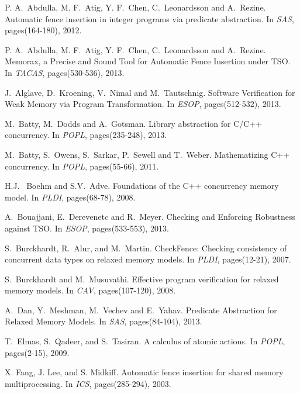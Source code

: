 \documentclass[preprint,9pt]{sigplanconf}
\begin{document}

\begin{thebibliography}{10}

P. A.~Abdulla, M. F.~Atig, Y. F.~Chen, C.~Leonardsson and A.~Rezine.
\newblock Automatic fence insertion in integer programs via predicate abstraction.
\newblock In {\em SAS}, pages(164-180), 2012.

P. A.~Abdulla, M. F.~Atig, Y. F.~Chen, C.~Leonardsson and A.~Rezine.
\newblock Memorax, a Precise and Sound Tool for Automatic Fence Insertion under TSO.
\newblock In {\em TACAS}, pages(530-536), 2013.

J.~Alglave, D.~Kroening, V.~Nimal and M.~Tautschnig.
\newblock   Software Verification for Weak Memory via Program Transformation.
\newblock In {\em ESOP}, pages(512-532), 2013.

M.~Batty, M.~Dodds and A.~Gotsman.
\newblock Library abstraction for C/C++ concurrency.
\newblock In {\em POPL}, pages(235-248), 2013.

M.~Batty, S.~Owens, S.~Sarkar, P.~Sewell and T.~Weber.
\newblock Mathematizing C++ concurrency.
\newblock In {\em POPL}, pages(55-66), 2011.

H.J.~ Boehm and S.V.~Adve.
\newblock Foundations of the C++ concurrency memory model.
\newblock In {\em PLDI}, pages(68-78), 2008.

A.~Bouajjani, E.~Derevenetc and R.~Meyer.
\newblock Checking and Enforcing Robustness against TSO.
\newblock In {\em ESOP}, pages(533-553), 2013.

S.~Burckhardt, R.~Alur, and M.~Martin.
\newblock CheckFence: Checking consistency of concurrent data types on relaxed memory models.
\newblock In {\em PLDI}, pages(12-21), 2007.

S.~Burckhardt and M.~Musuvathi.
\newblock Effective program verification for relaxed memory models.
\newblock In {\em CAV}, pages(107-120), 2008.

A.~Dan, Y.~Meshman, M.~Vechev and E.~Yahav.
\newblock Predicate Abstraction for Relaxed Memory Models.
\newblock In {\em SAS}, pages(84-104), 2013.

T.~Elmas, S.~Qadeer, and S.~Tasiran.
\newblock A calculus of atomic actions.
\newblock In {\em POPL}, pages(2-15), 2009.

X. Fang, J. Lee, and S. Midkiff.
\newblock Automatic fence insertion for shared memory multiprocessing.
\newblock In {\em ICS}, pages(285-294), 2003.


\end{thebibliography}
\end{document}
